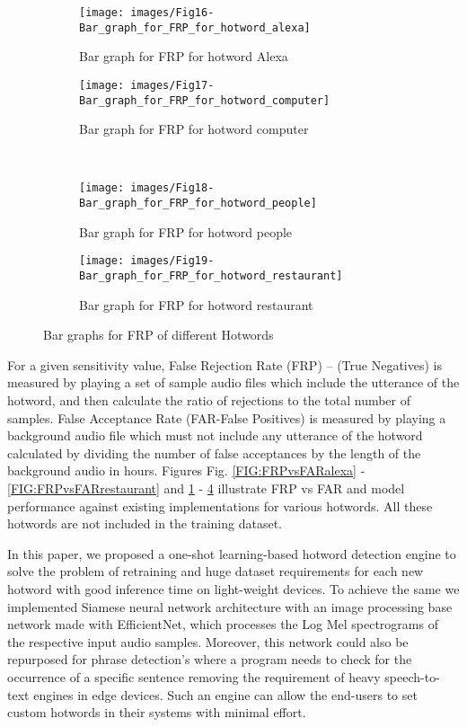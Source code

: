 \documentclass[10pt,twocolumn]{article}
\begin{document}
\begin{figure*}[htbp]
\begin{subfigure}{.5\textwidth}
  \centering
  \texttt{[image: images/Fig16-Bar\_graph\_for\_FRP\_for\_hotword\_alexa]}  
  \caption{Bar graph for FRP for hotword Alexa}
  \label{FIG:BarGraphAlexa}
\end{subfigure}
\begin{subfigure}{.5\textwidth}
  \centering
  \texttt{[image: images/Fig17-Bar\_graph\_for\_FRP\_for\_hotword\_computer]}
  \caption{Bar graph for FRP for hotword computer}
  \label{FIG:BarGraphComputer}
\end{subfigure}
\\
\begin{subfigure}{.5\textwidth}
  \centering
  \texttt{[image: images/Fig18-Bar\_graph\_for\_FRP\_for\_hotword\_people]}  
\caption{Bar graph for FRP for hotword people}
\label{FIG:BarGraphPeople}
  \end{subfigure}
\begin{subfigure}{.5\textwidth}
  \centering
 \texttt{[image: images/Fig19-Bar\_graph\_for\_FRP\_for\_hotword\_restaurant]}  
\caption{Bar graph for FRP for hotword restaurant}
 \label{FIG:BarGraphRestaurant}
  \end{subfigure}
\caption{Bar graphs for FRP of different Hotwords}
\label{fig:bar_graphs}
\end{figure*}

For a given sensitivity value, False Rejection Rate (FRP) – (True Negatives) is measured by playing a set of sample audio files which include the utterance of the hotword, and then calculate the ratio of rejections to the total number of samples. False Acceptance Rate (FAR-False Positives) is  measured by playing a background audio file which must not include any utterance of the hotword calculated by dividing the number of false acceptances by the length of the background audio in hours. Figures Fig. \ref{FIG:FRPvsFARalexa} - \ref{FIG:FRPvsFARrestaurant} and \ref{FIG:BarGraphAlexa} - \ref{FIG:BarGraphRestaurant} illustrate FRP vs FAR and model performance against existing implementations for various hotwords. All these hotwords are not included in the training dataset.


\label{Sec:conclusion}

In this paper, we proposed a one-shot learning-based hotword detection engine to solve the problem of retraining and huge dataset requirements for each new hotword with good inference time on light-weight devices. To achieve the same we implemented Siamese neural network architecture with an image processing base network made with EfficientNet, which processes the Log Mel spectrograms of the respective input audio samples. Moreover, this network could also be repurposed for phrase detection's where a program needs to check for the occurrence of a specific sentence removing the requirement of heavy speech-to-text engines in edge devices. Such an engine can allow the end-users to set custom hotwords in their systems with minimal effort.
\end{document}
